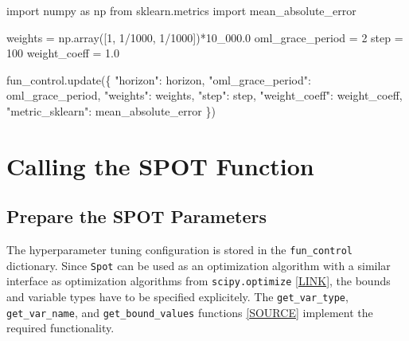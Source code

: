 \documentclass[
  letterpaper,
  DIV=11,
  numbers=noendperiod]{scrreprt}
\newenvironment{Shaded}{\begin{snugshade}}{\end{snugshade}}
\newcommand{\DecValTok}[1]{\textcolor[rgb]{0.68,0.00,0.00}{#1}}
\newcommand{\FloatTok}[1]{\textcolor[rgb]{0.68,0.00,0.00}{#1}}
\newcommand{\ImportTok}[1]{\textcolor[rgb]{0.00,0.46,0.62}{#1}}
\newcommand{\NormalTok}[1]{\textcolor[rgb]{0.00,0.23,0.31}{#1}}
\newcommand{\OperatorTok}[1]{\textcolor[rgb]{0.37,0.37,0.37}{#1}}
\newcommand{\StringTok}[1]{\textcolor[rgb]{0.13,0.47,0.30}{#1}}
\begin{document}
\begin{Shaded}
\begin{Highlighting}[]
\ImportTok{import}\NormalTok{ numpy }\ImportTok{as}\NormalTok{ np}
\ImportTok{from}\NormalTok{ sklearn.metrics }\ImportTok{import}\NormalTok{ mean\_absolute\_error}

\NormalTok{weights }\OperatorTok{=}\NormalTok{ np.array([}\DecValTok{1}\NormalTok{, }\DecValTok{1}\OperatorTok{/}\DecValTok{1000}\NormalTok{, }\DecValTok{1}\OperatorTok{/}\DecValTok{1000}\NormalTok{])}\OperatorTok{*}\FloatTok{10\_000.0}
\NormalTok{oml\_grace\_period }\OperatorTok{=} \DecValTok{2}
\NormalTok{step }\OperatorTok{=} \DecValTok{100}
\NormalTok{weight\_coeff }\OperatorTok{=} \FloatTok{1.0}

\NormalTok{fun\_control.update(\{}
               \StringTok{"horizon"}\NormalTok{: horizon,}
               \StringTok{"oml\_grace\_period"}\NormalTok{: oml\_grace\_period,}
               \StringTok{"weights"}\NormalTok{: weights,}
               \StringTok{"step"}\NormalTok{: step,}
               \StringTok{"weight\_coeff"}\NormalTok{: weight\_coeff,}
               \StringTok{"metric\_sklearn"}\NormalTok{: mean\_absolute\_error}
\NormalTok{               \})}
\end{Highlighting}
\end{Shaded}

\hypertarget{calling-the-spot-function-1}{%
\section{Calling the SPOT Function}\label{calling-the-spot-function-1}}

\hypertarget{prepare-the-spot-parameters-1}{%
\subsection{Prepare the SPOT
Parameters}\label{prepare-the-spot-parameters-1}}

The hyperparameter tuning configuration is stored in the
\texttt{fun\_control} dictionary. Since \texttt{Spot} can be used as an
optimization algorithm with a similar interface as optimization
algorithms from \texttt{scipy.optimize}
\href{https://docs.scipy.org/doc/scipy/reference/optimize.html\#module-scipy.optimize}{{[}LINK{]}},
the bounds and variable types have to be specified explicitely. The
\texttt{get\_var\_type}, \texttt{get\_var\_name}, and
\texttt{get\_bound\_values} functions
\href{https://github.com/sequential-parameter-optimization/spotPython/blob/main/src/spotPython/hyperparameters/values.py}{{[}SOURCE{]}}
implement the required functionality.
\end{document}
